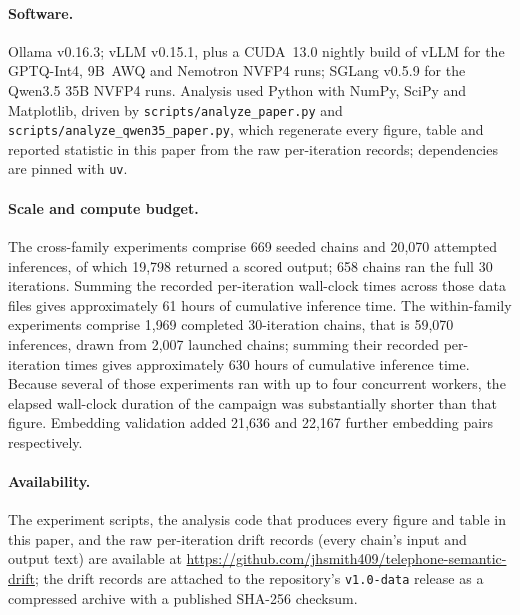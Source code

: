 \documentclass[11pt]{article}
\begin{document}
\paragraph{Software.}
Ollama v0.16.3; vLLM v0.15.1, plus a CUDA~13.0 nightly build of vLLM for the
GPTQ-Int4, 9B~AWQ and Nemotron NVFP4 runs; SGLang v0.5.9 for the Qwen3.5
35B NVFP4 runs. Analysis used Python
with NumPy, SciPy and Matplotlib, driven by
\texttt{scripts/\allowbreak analyze\_paper.py} and
\texttt{scripts/\allowbreak analyze\_qwen35\_paper.py}, which regenerate every
figure, table and reported statistic in this paper from the raw per-iteration
records; dependencies are pinned with \texttt{uv}.

\paragraph{Scale and compute budget.}
The cross-family experiments comprise 669 seeded chains and 20{,}070 attempted
inferences, of which 19{,}798 returned a scored output; 658 chains ran the full
30 iterations. Summing the recorded per-iteration wall-clock times across those
data files gives approximately 61 hours of cumulative inference time. The
within-family experiments comprise 1{,}969 completed 30-iteration chains, that
is 59{,}070 inferences, drawn from 2{,}007 launched chains; summing their
recorded per-iteration times gives approximately 630 hours of cumulative
inference time. Because several of those experiments ran with up to four
concurrent workers, the elapsed wall-clock duration of the campaign was
substantially shorter than that figure. Embedding validation added 21{,}636 and
22{,}167 further embedding pairs respectively.

\paragraph{Availability.}
The experiment scripts, the analysis code that produces every figure and
table in this paper, and the raw per-iteration drift records (every chain's
input and output text) are available at
\url{https://github.com/jhsmith409/telephone-semantic-drift}; the drift
records are attached to the repository's \texttt{v1.0-data} release as a
compressed archive with a published SHA-256 checksum.
\end{document}
